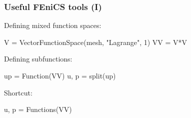 \begin{frame}[fragile]
  \frametitle{Useful FEniCS tools (I)}

  Defining mixed function spaces:
  \vspace{-0.5cm}
\begin{python}
V = VectorFunctionSpace(mesh, "Lagrange", 1)
VV = V*V
\end{python}

  Defining subfunctions:
  \vspace{-0.5cm}
  \begin{python}
up = Function(VV)
u, p = split(up)
  \end{python}

  Shortcut:
  \vspace{-0.5cm}
  \begin{python}
u, p = Functions(VV)
  \end{python}

\end{frame}
